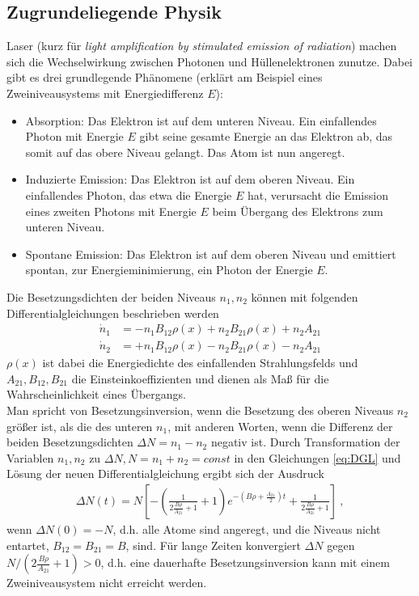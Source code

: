 \subsection{Zugrundeliegende Physik}
Laser (kurz für \textit{light amplification by stimulated emission of radiation}) machen sich die Wechselwirkung zwischen Photonen und Hüllenelektronen zunutze. Dabei gibt es drei grundlegende Phänomene (erklärt am Beispiel eines Zweiniveausystems mit Energiedifferenz $E$):
\begin{itemize}
	\item Absorption: Das Elektron ist auf dem unteren Niveau. Ein einfallendes Photon mit Energie $E$ gibt seine gesamte Energie an das Elektron ab, das somit auf das obere Niveau gelangt. Das Atom ist nun angeregt.
	\item Induzierte Emission: Das Elektron ist auf dem oberen Niveau. Ein einfallendes Photon, das etwa die Energie $E$ hat, verursacht die Emission eines zweiten Photons mit Energie $E$ beim Übergang des Elektrons zum unteren Niveau.
	\item Spontane Emission: Das Elektron ist auf dem oberen Niveau und emittiert spontan, zur Energieminimierung, ein Photon der Energie $E$.
\end{itemize}
Die Besetzungsdichten der beiden Niveaus $n_1,n_2$ können mit folgenden Differentialgleichungen beschrieben werden
\begin{align}\label{eq:DGL}
	\dot{n}_1 &= - n_1B_{12}\rho(x) + n_2B_{21}\rho(x) + n_2A_{21} \\
	\dot{n}_2 &= + n_1B_{12}\rho(x) - n_2B_{21}\rho(x) - n_2A_{21}
\end{align}
$\rho(x)$ ist dabei die Energiedichte des einfallenden Strahlungsfelds und $A_{21}, B_{12}, B_{21}$ die Einsteinkoeffizienten und dienen als Maß für die Wahrscheinlichkeit eines Übergangs. \\
Man spricht von Besetzungsinversion, wenn die Besetzung des oberen Niveaus $n_2$ größer ist, als die des unteren $n_1$, mit anderen Worten, wenn die Differenz der beiden Besetzungsdichten $\Delta N = n_1-n_2$ negativ ist. Durch Transformation der Variablen $n_1,n_2$ zu $\Delta N, N=n_1+n_2=const$ in den Gleichungen \eqref{eq:DGL} und Lösung der neuen Differentialgleichung ergibt sich der Ausdruck
\begin{align}
	\Delta N(t) = N \left[ -\left(\frac{1}{2\frac{B\rho}{A_{21}}+1}+1\right)
	 e^{-\left(B\rho+\frac{A_{21}}{2}\right)t} + \frac{1}{2\frac{B\rho}{A_{21}}+1} \right]\ ,
\end{align}
wenn $\Delta N(0) = -N$, d.h. alle Atome sind angeregt, und die Niveaus nicht entartet, $B_{12}=B_{21}=B$, sind. Für lange Zeiten konvergiert $\Delta N$ gegen $N\slash(2\frac{B\rho}{A_{21}}+1) > 0$, d.h. eine dauerhafte Besetzungsinversion kann mit einem Zweiniveausystem nicht erreicht werden.
